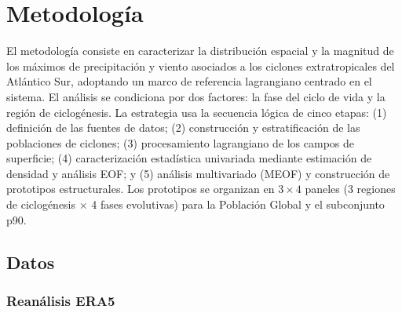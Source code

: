 \chapter{Metodología}\label{ch:metodologia}



El metodología consiste en caracterizar la distribución espacial y la magnitud de los máximos de precipitación y viento asociados a los ciclones extratropicales del Atlántico Sur, adoptando un marco de referencia lagrangiano centrado en el sistema. 
El análisis se condiciona por dos factores: la fase del ciclo de vida y la región de ciclogénesis. 
La estrategia usa la secuencia lógica de cinco etapas: (1) definición de las fuentes de datos; (2) construcción y estratificación de las poblaciones de ciclones; (3) procesamiento lagrangiano de los campos de superficie; (4) caracterización estadística univariada mediante estimación de densidad y análisis EOF; y (5) análisis multivariado (MEOF) y construcción de prototipos estructurales. 
Los prototipos se organizan en $3 \times 4$ paneles (3 regiones de ciclogénesis $\times$ 4 fases evolutivas) para la Población Global y el subconjunto p90.


\section{Datos}\label{sec:datos}

\subsection{Reanálisis ERA5}\label{sec:datos_era5}

